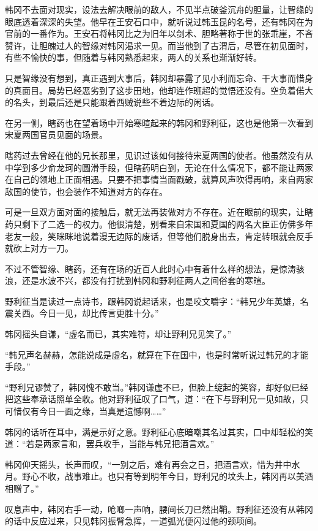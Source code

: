 韩冈不去面对现实，设法去解决眼前的敌人，不见半点破釜沉舟的胆量，让智缘的眼底透着深深的失望。他早在王安石口中，就听说过韩玉昆的名号，还有韩冈在为官前的一番作为。王安石将韩冈比之为旧年以剑术、胆略著称于世的张乖崖，不吝赞许，让胆魄过人的智缘对韩冈渴求一见。而当他到了古渭后，尽管在初见面时，有些不愉快的事，但随着与韩冈熟悉起来，两人的关系也渐渐好转。

只是智缘没有想到，真正遇到大事后，韩冈却暴露了见小利而忘命、干大事而惜身的真面目。局势已经恶劣到了这步田地，他却连作班超的觉悟还没有。空负着偌大的名头，到最后还是只能跟着西贼说些不着边际的闲话。

在另一侧，瞎药也在望着场中开始寒暄起来的韩冈和野利征，这也是他第一次看到宋夏两国官员见面的场景。

瞎药过去曾经在他的兄长那里，见识过该如何接待宋夏两国的使者。他虽然没有从中学到多少俞龙珂的圆滑手段，但瞎药明白到，无论在什么情况下，都不能让两家在自己的领地上正面相遇。只要不把事情当面戳破，就算风声吹得再响，来自两家敌国的使节，也会装作不知道对方的存在。

可是一旦双方面对面的接触后，就无法再装做对方不存在。近在眼前的现实，让瞎药只剩下了二选一的权力。他很清楚，别看来自宋国和夏国的两名大臣正仿佛多年老友一般，笑眯眯地说着漫无边际的废话，但等他们脱身出去，肯定转眼就会反手就砍上对方一刀。

不过不管智缘、瞎药，还有在场的近百人此时心中有着什么样的想法，是惊涛骇浪，还是水波不兴，都没有打扰到韩冈和野利征两人之间俗套的寒暄。

野利征当是读过一点诗书，跟韩冈说起话来，也是咬文嚼字：“韩兄少年英雄，名震关西。今日一见，却比传言更胜十分。”

韩冈摇头自谦，“虚名而已，其实难符，却让野利兄见笑了。”

“韩兄声名赫赫，怎能说成是虚名，就算在下在国中，也是时常听说过韩兄的才能手段。”

“野利兄谬赞了，韩冈愧不敢当。”韩冈谦虚不已，但脸上绽起的笑容，却好似已经把这些奉承话照单全收。他对野利征叹了口气，道：“在下与野利兄一见如故，只可惜仅有今日一面之缘，当真是遗憾啊……”

韩冈的话听在耳中，满是示好之意。野利征心底暗嘲其名过其实，口中却轻松的笑道：“若是两家言和，罢兵收手，当能与韩兄把酒言欢。”

韩冈仰天摇头，长声而叹，“一别之后，难有再会之日，把酒言欢，惜为井中水月。野心不收，战事难止。也只有等到明年今日，野利兄的坟头上，韩冈再以美酒相赠了。”

叹息声中，韩冈右手一动，呛啷一声响，腰间长刀已然出鞘。野利征还没有从韩冈的话中反应过来，只见韩冈振臂急挥，一道弧光便闪过他的颈项间。


